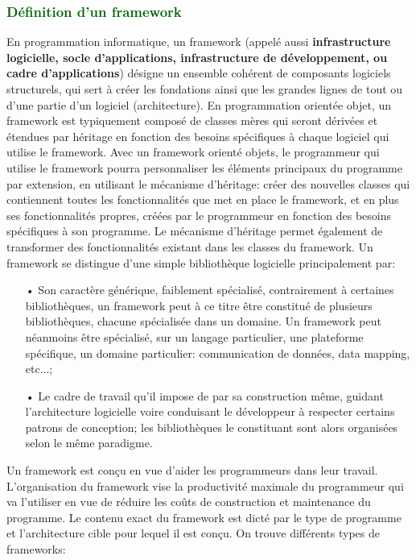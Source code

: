 \documentclass[ebook, 8pt, oneside, openany]{memoir}
\begin{document}
	\subsubsection{\textcolor{darkgreen}{Définition d'un framework}}
	En programmation informatique, un framework (appelé aussi \textbf{infrastructure logicielle, socle
	d'applications, infrastructure de développement, ou cadre d'applications}) désigne un ensemble cohérent
	de composants logiciels structurels, qui sert à créer les fondations ainsi que les grandes lignes de
	tout ou d’une partie d'un logiciel (architecture). En programmation orientée objet, un framework est
	typiquement composé de classes mères qui seront dérivées et étendues par héritage en fonction des
	besoins spécifiques à chaque logiciel qui utilise le framework. Avec un framework orienté objets, le
	programmeur qui utilise le framework pourra personnaliser les éléments principaux du programme par
	extension, en utilisant le mécanisme d'héritage: créer des nouvelles classes qui contiennent toutes les 
	fonctionnalités que met en place le framework, et en plus ses fonctionnalités propres, créées par le 
	programmeur en fonction des besoins spécifiques à son programme. Le mécanisme d'héritage permet 
	également de transformer des fonctionnalités existant dans les classes du framework. Un framework se 
	distingue d'une simple bibliothèque logicielle principalement par:
	\begin{itemize}
		\item[•] Son caractère générique, faiblement spécialisé, contrairement à certaines bibliothèques, un 
		framework peut à ce titre être constitué de plusieurs bibliothèques, chacune spécialisée dans un 
		domaine. Un framework peut néanmoins être spécialisé, sur un langage particulier, une plateforme 
		spécifique, un domaine particulier: communication de données, data mapping, etc...;
		\item[•] Le cadre de travail qu'il impose de par sa construction même, guidant l'architecture 
		logicielle voire conduisant le développeur à respecter certains patrons de conception; les 
		bibliothèques le constituant sont alors organisées selon le même paradigme.
	\end{itemize}
	Un framework est conçu en vue d'aider les programmeurs dans leur travail. L'organisation du framework 
	vise la productivité maximale du programmeur qui va l'utiliser en vue de réduire les coûts de 
	construction et maintenance du programme. Le contenu exact du framework est dicté par le type de 
	programme et l'architecture cible pour lequel il est conçu. On trouve différents types de frameworks:
\end{document}
